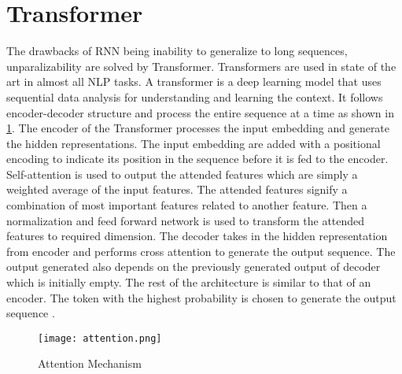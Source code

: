 \section{Transformer}
The drawbacks of RNN being inability to generalize to long sequences, unparalizability are solved by Transformer. Transformers are used in state of the art in almost all NLP tasks. A transformer is a deep learning model that uses sequential data analysis for understanding and learning the context. It follows encoder-decoder structure and process the entire sequence at a time as shown in \ref{fig:attention}. The encoder of the Transformer processes the input embedding and generate the hidden representations. The input embedding are added with a positional encoding to indicate its position in the sequence before it is fed to the encoder. Self-attention is used to output the attended features which are simply a weighted average of the input features. The attended features signify a combination of most important features related to another feature. Then a normalization and feed forward network is used to transform the attended features to required dimension.
The decoder takes in the hidden representation from encoder and performs cross attention to generate the output sequence. The output generated also depends on the previously generated output of decoder which is initially empty. The rest of the architecture is similar to that of an encoder. The token with the highest probability is chosen to generate the output sequence \cite{a2018_11}.

\begin{figure}[h]
    \centering
    \texttt{[image: attention.png]}
    \caption{Attention Mechanism}
    \label{fig:attention}
\end{figure}

